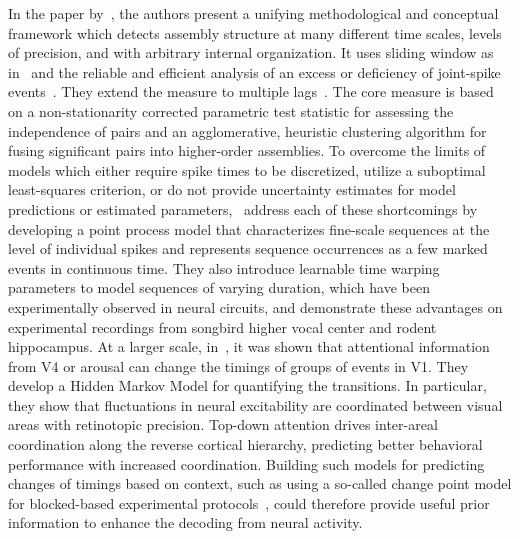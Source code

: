 \documentclass[brainsci, %
               review,submit,pdftex,moreauthors
               ]{Definitions/mdpi}
\begin{document}
In the paper by~\citet{russo_cell_2017}, the authors present a unifying methodological and conceptual framework which detects assembly structure at many different time scales, levels of precision, and with arbitrary internal organization. It uses  sliding window as in~\citep{grun_unitary_2002} and the reliable and efficient analysis of an excess or deficiency of joint-spike events~\citep{pipa_neuroxidence_2008}. They extend the measure to multiple lags~\citep{torre_synchronous_2016}. The core measure is based on a non-stationarity corrected parametric test statistic for assessing the independence of pairs and an agglomerative, heuristic clustering algorithm for fusing significant pairs into higher-order assemblies.  To overcome the limits of models which either require spike times to be discretized, utilize a suboptimal least-squares criterion, or do not provide uncertainty estimates for model predictions or estimated parameters,~\citep{williams_point_2020} address each of these shortcomings by developing a point process model that characterizes fine-scale sequences at the level of individual spikes and represents sequence occurrences as a few marked events in continuous time. They also introduce learnable time warping parameters to model sequences of varying duration, which have been experimentally observed in neural circuits, and demonstrate these advantages on experimental recordings from songbird higher vocal center and rodent hippocampus.
At a larger scale, in~\citep{van_kempen_top-down_2021}, it was shown that attentional information from V4 or arousal can change the timings of groups of events in V1. They develop a Hidden Markov Model for quantifying the transitions. In particular, they show that fluctuations in neural excitability are coordinated between visual areas with retinotopic precision. Top-down attention drives inter-areal coordination along the reverse cortical hierarchy, predicting better behavioral performance with increased coordination. Building such models for predicting changes of timings based on context, such as using a so-called change point model for blocked-based experimental protocols~\citep{pasturel_humans_2020}, could therefore provide useful prior information to enhance the decoding from neural activity.

\end{document}
